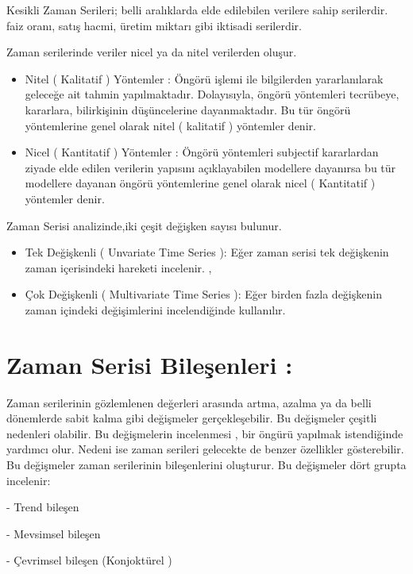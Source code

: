 \documentclass[11pt]{article}
\providecommand{\tightlist}{%
      \setlength{\itemsep}{0pt}\setlength{\parskip}{0pt}}
\begin{document}
Kesikli Zaman Serileri; belli aralıklarda elde edilebilen verilere sahip
serilerdir. faiz oranı, satış hacmi, üretim miktarı gibi iktisadi
serilerdir.

Zaman serilerinde veriler nicel ya da nitel verilerden oluşur.

\begin{itemize}
\item
  Nitel ( Kalitatif ) Yöntemler : Öngörü işlemi ile bilgilerden
  yararlanılarak geleceğe ait tahmin yapılmaktadır. Dolayısıyla, öngörü
  yöntemleri tecrübeye, kararlara, bilirkişinin düşüncelerine
  dayanmaktadır. Bu tür öngörü yöntemlerine genel olarak nitel (
  kalitatif ) yöntemler denir.
\item
  Nicel ( Kantitatif ) Yöntemler : Öngörü yöntemleri subjectif
  kararlardan ziyade elde edilen verilerin yapısını açıklayabilen
  modellere dayanırsa bu tür modellere dayanan öngörü yöntemlerine genel
  olarak nicel ( Kantitatif ) yöntemler denir.
\end{itemize}

Zaman Serisi analizinde,iki çeşit değişken sayısı bulunur.
\begin{itemize}
\tightlist
\item
  Tek Değişkenli ( Unvariate Time Series ): Eğer zaman serisi tek değişkenin zaman içerisindeki hareketi incelenir. ,

\item
  Çok Değişkenli ( Multivariate Time Series ): Eğer birden fazla değişkenin zaman içindeki değişimlerini incelendiğinde kullanılır.
\end{itemize}

\section{Zaman Serisi Bileşenleri :}\label{zaman-serisi-bileux15fenleri}

Zaman serilerinin gözlemlenen değerleri arasında artma, azalma ya da
belli dönemlerde sabit kalma gibi değişmeler gerçekleşebilir. Bu
değişmeler çeşitli nedenleri olabilir. Bu değişmelerin incelenmesi , bir
öngürü yapılmak istendiğinde yardımcı olur. Nedeni ise zaman serileri
gelecekte de benzer özellikler gösterebilir. Bu değişmeler zaman
serilerinin bileşenlerini oluşturur. Bu değişmeler dört grupta
incelenir: 

- Trend bileşen 

- Mevsimsel bileşen

- Çevrimsel bileşen (Konjoktürel ) 
\end{document}
